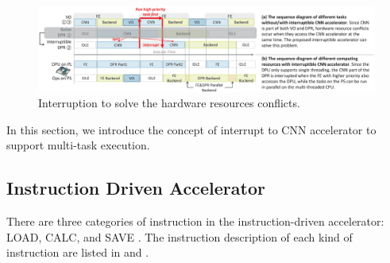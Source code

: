 \label{sec:cnninterrupt}





\begin{figure}[t]
	\centering
	\includegraphics[width=0.99\linewidth]{fig/interDPR.eps}
    \caption{Interruption to solve the hardware resources conflicts.  
    }
	\label{fig:interDPR}
\end{figure}


In this section, we introduce the concept of interrupt to CNN accelerator to support multi-task execution.

\subsection{ Instruction Driven Accelerator }

There are three categories of instruction in the instruction-driven accelerator: LOAD, CALC, and SAVE \cite{guo2017angel, yu2018instruction}. The instruction description of each kind of instruction are listed in  and .


